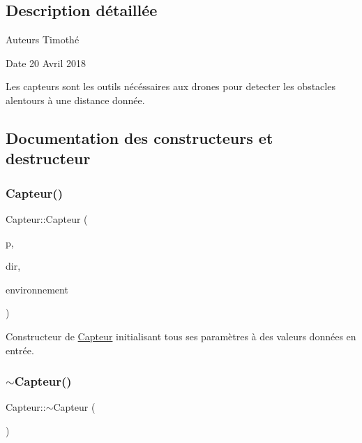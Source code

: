 \subsection{Description détaillée}
\begin{DoxyAuthor}{Auteurs}
Timothé 
\end{DoxyAuthor}
\begin{DoxyDate}{Date}
20 Avril 2018
\end{DoxyDate}
Les capteurs sont les outils nécéssaires aux drones pour detecter les obstacles alentours à une distance donnée. 

\subsection{Documentation des constructeurs et destructeur}
\mbox{\label{class_capteur_a507682442d44b555477ada24146be12f}} 
\subsubsection{\texorpdfstring{Capteur()}{Capteur()}}
{\footnotesize\ttfamily Capteur\+::\+Capteur (\begin{DoxyParamCaption}\item[{const float \&}]{p,  }\item[{const \mbox{\hyperlink{class_vecteur_r3}{Vecteur\+R3}} \&}]{dir,  }\item[{\mbox{\hyperlink{class_environnement}{Environnement}} $\ast$}]{environnement }\end{DoxyParamCaption})}

Constructeur de \mbox{\hyperlink{class_capteur}{Capteur}} initialisant tous ses paramètres à des valeurs données en entrée. \mbox{\label{class_capteur_a2bbfecdceba5e9a13fc7c55cc5f7eae3}} 
\subsubsection{\texorpdfstring{$\sim$\+Capteur()}{~Capteur()}}
{\footnotesize\ttfamily Capteur\+::$\sim$\+Capteur (\begin{DoxyParamCaption}{ }\end{DoxyParamCaption})\hspace{0.3cm}{\ttfamily [virtual]}}

